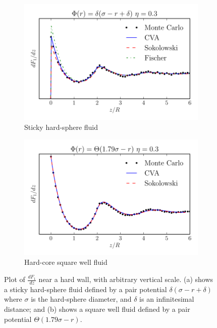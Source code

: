 \begin{figure}
  \begin{subfigure}{.9\columnwidth}
    \includegraphics[width=\columnwidth]{figs/dadz-3-2.pdf}
    \vspace{-0.8cm}
    \caption{Sticky hard-sphere fluid}\label{fig:dadz-delta}
  \end{subfigure}
  \begin{subfigure}{.9\columnwidth}
    \includegraphics[width=\columnwidth]{figs/dadz-square-well-3.pdf}
    \vspace{-0.8cm}
    \caption{Hard-core square well fluid}\label{fig:dadz-square-well}
  \end{subfigure}
  \caption{Plot of $\frac{dF_1}{dz}$ near a hard wall, with arbitrary
    vertical scale.  (a) shows a
    sticky hard-sphere fluid defined by a pair potential
    $\delta(\sigma-r+\delta)$ where $\sigma$ is the hard-sphere
    diameter, and $\delta$ is an infinitesimal distance; and (b) shows a
    square well fluid defined by a pair potential $\Theta(1.79
    \sigma-r)$.
  }
  \label{fig:dadz}
\end{figure}

